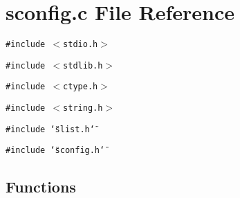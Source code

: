 \section{sconfig.c File Reference}
\label{sconfig_8c}
{\tt \#include $<$stdio.h$>$}\par
{\tt \#include $<$stdlib.h$>$}\par
{\tt \#include $<$ctype.h$>$}\par
{\tt \#include $<$string.h$>$}\par
{\tt \#include \char`\"{}slist.h\char`\"{}}\par
{\tt \#include \char`\"{}sconfig.h\char`\"{}}\par
\subsection*{Functions}
